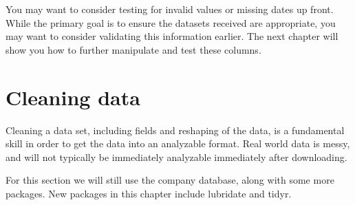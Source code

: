 \documentclass[
]{book}
\newenvironment{Shaded}{\begin{snugshade}}{\end{snugshade}}
\newcommand{\CommentTok}[1]{\textcolor[rgb]{0.56,0.35,0.01}{\textit{#1}}}
\newcommand{\DataTypeTok}[1]{\textcolor[rgb]{0.13,0.29,0.53}{#1}}
\newcommand{\KeywordTok}[1]{\textcolor[rgb]{0.13,0.29,0.53}{\textbf{#1}}}
\newcommand{\NormalTok}[1]{#1}
\newcommand{\OperatorTok}[1]{\textcolor[rgb]{0.81,0.36,0.00}{\textbf{#1}}}
\newcommand{\OtherTok}[1]{\textcolor[rgb]{0.56,0.35,0.01}{#1}}
\newcommand{\StringTok}[1]{\textcolor[rgb]{0.31,0.60,0.02}{#1}}
\begin{document}
You may want to consider testing for invalid values or missing dates up front. While the primary goal is to ensure the datasets received are appropriate, you may want to consider validating this information earlier. The next chapter will show you how to further manipulate and test these columns.

\hypertarget{cleaning-data}{%
\chapter{Cleaning data}\label{cleaning-data}}

Cleaning a data set, including fields and reshaping of the data, is a fundamental skill in order to get the data into an analyzable format. Real world data is messy, and will not typically be immediately analyzable immediately after downloading.

For this section we will still use the company database, along with some more packages. New packages in this chapter include lubridate and tidyr.

\begin{Shaded}
\end{Shaded}
\end{document}
